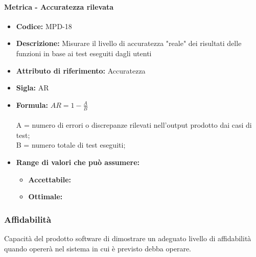                \paragraph{Metrica - Accuratezza rilevata} 
            \begin{itemize}
           \item   \textbf{Codice:} MPD-18
            \item  \textbf{Descrizione:} Misurare il livello di accuratezza "reale" dei risultati delle funzioni in base ai test eseguiti dagli utenti
           \item   \textbf{Attributo di riferimento:} Accuratezza
            \item  \textbf{Sigla:} AR
           \item   \textbf{Formula:} \begin{math}AR = 1- \frac{A}{B}\end{math}\\ \\
            A = numero di errori o discrepanze rilevati nell'output prodotto dai casi di test;\\
            B = numero totale di test eseguiti;
            \item \textbf{Range di valori che può assumere:}
        \begin{itemize}
            \item \textbf{Accettabile:} 
            \item \textbf{Ottimale:} 
        \end{itemize}
       \end{itemize}
       
          \subsubsection{Affidabilità}
   Capacità del prodotto software di dimostrare un adeguato livello di affidabilità quando opererà nel sistema in cui è previsto debba operare.
   

